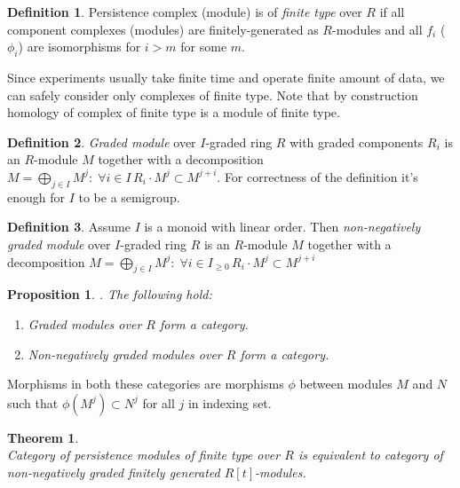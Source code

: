 \documentclass[a4paper, 12pt]{article}
\newtheorem{proposition}{Proposition}
\newtheorem{theorem}{Theorem}
\theoremstyle{definition}
\newtheorem{definition}{Definition}
\theoremstyle{remark}
\newcommand{\define}[1]{{\textit{#1}}}
\renewcommand{\geq}{\geqslant}
\begin{document}
\begin{definition}
  Persistence complex (module) is of \define{finite type} over $R$ if all component complexes (modules) are finitely-generated as $R$-modules and all $f_i$ ($\phi_i$) are isomorphisms for $i > m$ for some $m$.
\end{definition}

Since experiments usually take finite time and operate finite amount of data, we can safely consider only complexes of finite type. Note that by construction homology of complex of finite type is a module of finite type.\\

\begin{definition}
  \define{Graded module} over $I$-graded ring $R$ with graded components $R_i$ is an $R$-module $M$ together with a decomposition $M = \bigoplus_{j \in I} M^j:\; \forall i \in I\, R_i \cdot M^j \subset M^{j+i}$. For correctness of the definition it's enough for $I$ to be a semigroup.
\end{definition}

\begin{definition}
  Assume $I$ is a monoid with linear order. Then \define{non-negatively graded module} over $I$-graded ring $R$ is an $R$-module $M$ together with a decomposition $M = \bigoplus_{j \in I} M^j:\; \forall i \in I_{\geq 0}\, R_i \cdot M^j \subset M^{j+i}$
\end{definition}

\begin{proposition}. The following hold:
  \begin{enumerate}
    \item Graded modules over $R$ form a category.
    \item Non-negatively graded modules over $R$ form a category.
  \end{enumerate}
\end{proposition}

Morphisms in both these categories are morphisms $\phi$ between modules $M$ and $N$ such that $\phi(M^j) \subset N^j$ for all $j$ in indexing set.\\

\begin{theorem} {\cite[Theorem 3.1]{Zomorodian05}}\\
  Category of persistence modules of finite type over $R$ is equivalent to category of non-negatively graded finitely generated $R[t]$-modules.
\end{theorem}
\end{document}
